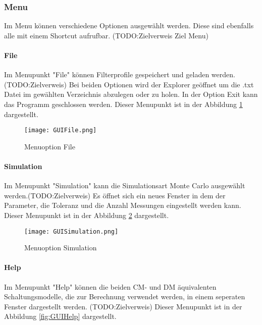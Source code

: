 \subsubsection{Menu} \label{subsubsec:menu}

Im Menu können verschiedene Optionen ausgewählt werden. Diese sind ebenfalls alle mit einem Shortcut aufrufbar. (TODO:Zielverweis Ziel Menu)

\bigskip
{}
\paragraph{File} \label{para:file}
Im Menupunkt "File" können Filterprofile gespeichert und geladen werden. (TODO:Zielverweis) Bei beiden Optionen wird der Explorer geöffnet um die .txt Datei im gewählten Verzeichnis abzulegen oder zu holen. In der Option Exit kann das Programm geschlossen werden. Dieser Menupunkt ist in der Abbildung \ref{fig:GUIFile}  dargestellt.

\begin{figure}[H]
	\centering
	\texttt{[image: GUIFile.png]}
	\caption{Menuoption File}
	\label{fig:GUIFile}
\end{figure}

\bigskip

\paragraph{Simulation} \label{para:simulation}
Im Menupunkt "Simulation" kann die Simulationsart Monte Carlo ausgewählt werden.(TODO:Zielverweis) Es öffnet sich ein neues Fenster in dem der Parameter, die Toleranz und die Anzahl Messungen eingestellt werden kann. Dieser Menupunkt ist in der Abbildung \ref{fig:GUISimulation} dargestellt.

\begin{figure}[H]
	\centering
	\texttt{[image: GUISimulation.png]}
	\caption{Menuoption Simulation}
	\label{fig:GUISimulation}
\end{figure}

\newpage

\paragraph{Help} \label{para:Help}
Im Menupunkt "Help" können die beiden CM- und DM äquivalenten Schaltungsmodelle, die zur Berechnung verwendet werden, in einem seperaten Fenster dargestellt werden. (TODO:Zielverweis) Dieser Menupunkt ist in der Abbildung \ref{fig:GUIHelp}  dargestellt.


